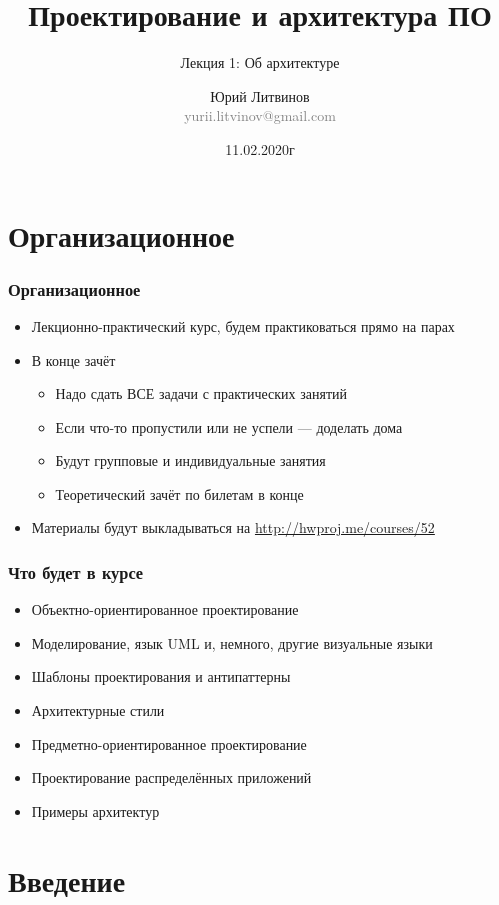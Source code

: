 \documentclass[xetex,mathserif,serif]{beamer}
\title{Проектирование и архитектура ПО}
\subtitle{Лекция 1: Об архитектуре}
\author[Юрий Литвинов]{Юрий Литвинов\\\small{\textcolor{gray}{yurii.litvinov@gmail.com}}}
\date{11.02.2020г}
\begin{document}
	\frame{\titlepage}

	\section{Организационное}

	\begin{frame}
		\frametitle{Организационное}
		\begin{itemize}
			\item Лекционно-практический курс, будем практиковаться прямо на парах
			\item В конце зачёт
			\begin{itemize}
				\item Надо сдать ВСЕ задачи с практических занятий
				\item Если что-то пропустили или не успели --- доделать дома
				\item Будут групповые и индивидуальные занятия
				\item Теоретический зачёт по билетам в конце
			\end{itemize}
			\item Материалы будут выкладываться на \url{http://hwproj.me/courses/52}
		\end{itemize}
	\end{frame}

	\begin{frame}
		\frametitle{Что будет в курсе}
		\begin{itemize}
			\item Объектно-ориентированное проектирование
			\item Моделирование, язык UML и, немного, другие визуальные языки
			\item Шаблоны проектирования и антипаттерны
			\item Архитектурные стили
			\item Предметно-ориентированное проектирование
			\item Проектирование распределённых приложений
			\item Примеры архитектур
		\end{itemize}
	\end{frame}

	\section{Введение}
\end{document}
